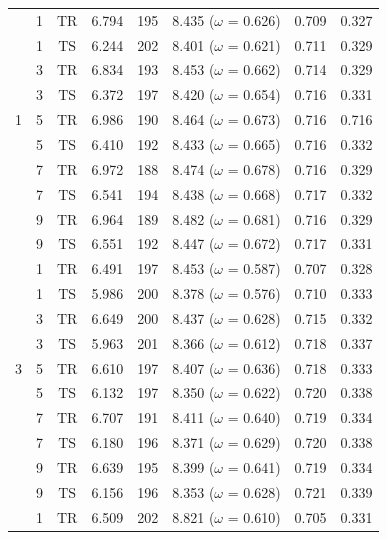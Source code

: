 \documentclass[doc,natbib,floatsintext]{apa7}
\begin{document}
\begin{appendices}
\begin{table}[!ht]
\begin{center}
{\begin{tabular}{c c c c c c c c}
\midrule
& 1 & $\text{TR}$ & 6.794 & 195 &  8.435 ($\omega$ = 0.626) & 0.709 & 0.327\\
& 1 & $\text{TS}$ & 6.244 & 202 &  8.401 ($\omega$ = 0.621) & 0.711 & 0.329\\
& 3 & $\text{TR}$ & 6.834 & 193 &  8.453 ($\omega$ = 0.662) & 0.714 & 0.329\\
& 3 & $\text{TS}$ & 6.372 & 197 &  8.420 ($\omega$ = 0.654) & 0.716 & 0.331\\
1 & 5 & $\text{TR}$ & 6.986 & 190 &  8.464 ($\omega$ = 0.673) & 0.716 & 0.716\\
& 5 & $\text{TS}$ & 6.410 & 192 &  8.433 ($\omega$ = 0.665) & 0.716 & 0.332\\
& 7 & $\text{TR}$ & 6.972 & 188 &  8.474 ($\omega$ = 0.678) & 0.716 & 0.329\\
& 7 & $\text{TS}$ & 6.541 & 194 &  8.438 ($\omega$ = 0.668) & 0.717 & 0.332\\
& 9 & $\text{TR}$ & 6.964 & 189 &  8.482 ($\omega$ = 0.681) & 0.716 & 0.329\\
& 9 & $\text{TS}$ & 6.551 & 192 &  8.447 ($\omega$ = 0.672) & 0.717 & 0.331\\
\midrule
& 1 & $\text{TR}$ & 6.491 & 197 &  8.453 ($\omega$ = 0.587) & 0.707 & 0.328\\
& 1 & $\text{TS}$ & 5.986 & 200 &  8.378 ($\omega$ = 0.576) & 0.710 & 0.333\\
& 3 & $\text{TR}$ & 6.649 & 200 &  8.437 ($\omega$ = 0.628) & 0.715 & 0.332\\
& 3 & $\text{TS}$ & 5.963 & 201 &  8.366 ($\omega$ = 0.612) & 0.718 & 0.337\\
3 & 5 & $\text{TR}$ & 6.610 & 197 &  8.407 ($\omega$ = 0.636) & 0.718 & 0.333\\
& 5 & $\text{TS}$ & 6.132 & 197 &  8.350 ($\omega$ = 0.622) & 0.720 & 0.338\\
& 7 & $\text{TR}$ & 6.707 & 191 &  8.411 ($\omega$ = 0.640) & 0.719 & 0.334\\
& 7 & $\text{TS}$ & 6.180 & 196 &  8.371 ($\omega$ = 0.629) & 0.720 & 0.338\\
& 9 & $\text{TR}$ & 6.639 & 195 &  8.399 ($\omega$ = 0.641) & 0.719 & 0.334\\
& 9 & $\text{TS}$ & 6.156 & 196 &  8.353 ($\omega$ = 0.628) & 0.721 & 0.339\\
\midrule
& 1 & $\text{TR}$ & 6.509 & 202 &  8.821 ($\omega$ = 0.610) & 0.705 & 0.331\\

\end{tabular}}
\end{center}
\end{table}
\end{appendices}
\end{document}

